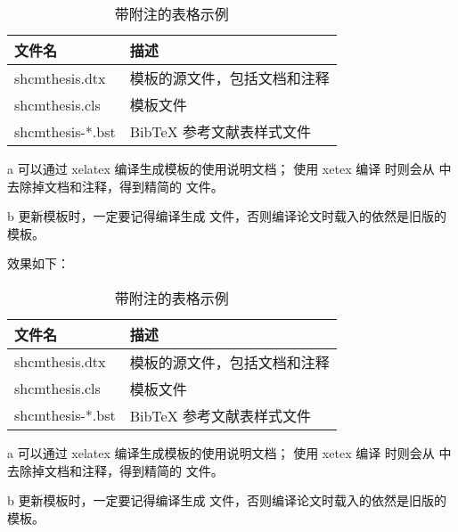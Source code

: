 \begin{python}
\begin{table}
	\centering
	\begin{threeparttable}[c]
		\caption{带附注的表格示例}
		\label{tab:three-part-table}
		\begin{tabular}{ll}
			\toprule
			文件名                 & 描述                         \\
			\midrule
			shcmthesis.dtx\tnote{a} & 模板的源文件，包括文档和注释 \\
			shcmthesis.cls\tnote{b} & 模板文件                     \\
			shcmthesis-*.bst        & BibTeX 参考文献表样式文件    \\
			\bottomrule
		\end{tabular}
		\begin{tablenotes}
			\item [a] 可以通过 xelatex 编译生成模板的使用说明文档；
			使用 xetex 编译  时则会从  中去除掉文档和注释，得到精简的  文件。
			\item [b] 更新模板时，一定要记得编译生成  文件，否则编译论文时载入的依然是旧版的模板。
		\end{tablenotes}
	\end{threeparttable}
\end{table}
\end{python}

效果如下：

\begin{table}
	\centering
	\begin{threeparttable}[c]
		\caption{带附注的表格示例}
		\label{tab:three-part-table}
		\begin{tabular}{ll}
			\toprule
			文件名                 & 描述                         \\
			\midrule
			shcmthesis.dtx\tnote{a} & 模板的源文件，包括文档和注释 \\
			shcmthesis.cls\tnote{b} & 模板文件                     \\
			shcmthesis-*.bst        & BibTeX 参考文献表样式文件    \\
			\bottomrule
		\end{tabular}
		\begin{tablenotes}
			\item [a] 可以通过 xelatex 编译生成模板的使用说明文档；
			使用 xetex 编译  时则会从  中去除掉文档和注释，得到精简的 \file{.cls} 文件。
			\item [b] 更新模板时，一定要记得编译生成  文件，否则编译论文时载入的依然是旧版的模板。
		\end{tablenotes}
	\end{threeparttable}
\end{table}

